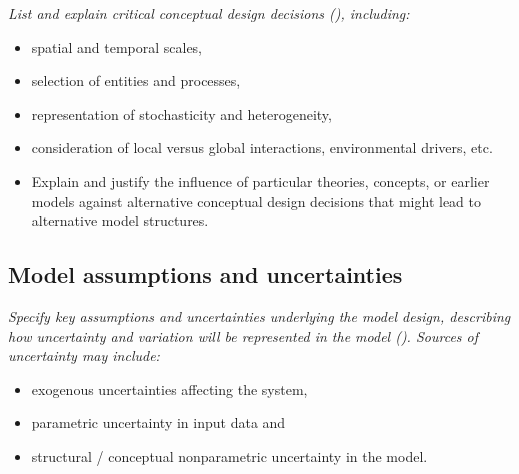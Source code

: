 \documentclass[
]{article}
\providecommand{\tightlist}{%
  \setlength{\itemsep}{0pt}\setlength{\parskip}{0pt}}
\begin{document}
\begin{tcolorbox}[enhanced jigsaw, opacitybacktitle=0.6, bottomrule=.15mm, leftrule=.75mm, rightrule=.15mm, colbacktitle=quarto-callout-caution-color!10!white, toprule=.15mm, titlerule=0mm, left=2mm, colframe=quarto-callout-caution-color-frame, breakable, title=\textcolor{quarto-callout-caution-color}{\faFire}\hspace{0.5em}{Preregistration Item}, opacityback=0, coltitle=black, bottomtitle=1mm, colback=white, toptitle=1mm, arc=.35mm]

\emph{List and explain critical conceptual design decisions
(), including:}

\begin{itemize}
\tightlist
\item[$\square$]
  spatial and temporal scales,
\item[$\square$]
  selection of entities and processes,
\item[$\square$]
  representation of stochasticity and heterogeneity,
\item[$\square$]
  consideration of local versus global interactions, environmental
  drivers, etc.
\item[$\square$]
  Explain and justify the influence of particular theories, concepts, or
  earlier models against alternative conceptual design decisions that
  might lead to alternative model structures.
\end{itemize}

\end{tcolorbox}

\subsection{Model assumptions and
uncertainties}\label{model-assumptions-and-uncertainties}

\begin{tcolorbox}[enhanced jigsaw, opacitybacktitle=0.6, bottomrule=.15mm, leftrule=.75mm, rightrule=.15mm, colbacktitle=quarto-callout-caution-color!10!white, toprule=.15mm, titlerule=0mm, left=2mm, colframe=quarto-callout-caution-color-frame, breakable, title=\textcolor{quarto-callout-caution-color}{\faFire}\hspace{0.5em}{Preregistration Item}, opacityback=0, coltitle=black, bottomtitle=1mm, colback=white, toptitle=1mm, arc=.35mm]

\emph{Specify key assumptions and uncertainties underlying the model
design, describing how uncertainty and variation will be represented in
the model (). Sources
of uncertainty may include:}

\begin{itemize}
\tightlist
\item[$\square$]
  exogenous uncertainties affecting the system,
\item[$\square$]
  parametric uncertainty in input data and
\item[$\square$]
  structural / conceptual nonparametric uncertainty in the model.
\end{itemize}

\end{tcolorbox}
\end{document}
